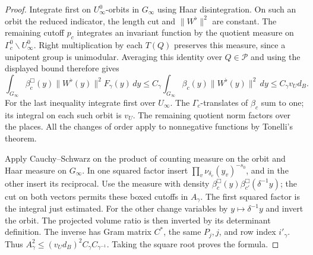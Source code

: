 \documentclass[a4paper,11pt]{article}
\theoremstyle{definition}
\theoremstyle{remark}
\numberwithin{equation}{section}
\begin{document}
\begin{proof}
Integrate first on \(U_\infty^0\)-orbits in \(G_\infty\) using
Haar disintegration. On such an orbit the reduced indicator,
the length cut and \(\|W^\flat\|^2\) are constant. The remaining
cutoff \(p_c\) integrates an invariant function by the quotient
measure on \(\Gamma_c^0\backslash U_\infty^0\). Right
multiplication by each \(T(Q)\) preserves this measure,
since a unipotent group is unimodular. Averaging this identity
over \(Q\in\mathcal P\) and using the displayed bound therefore gives
\[
 \int_{G_\infty}\beta_c^\Box(y)\|W^\flat(y)\|^2F_\gamma(y)\,dy
 \le C_\gamma\int_{G_\infty}\beta_c(y)\|W^\flat(y)\|^2\,dy
 \le C_\gamma v_U d_B .
\]
For the last inequality integrate first over \(U_\infty\).
The \(\Gamma_c\)-translates of \(\beta_c\) sum to one; its
integral on each such orbit is \(v_U\). The remaining quotient
norm factors over the places. All the changes of order apply
to nonnegative functions by Tonelli's theorem.

Apply Cauchy--Schwarz on the product of counting measure on
the orbit and Haar measure on \(G_\infty\). In one squared
factor insert \(\prod_v\nu_{\delta_v}(y_v)^{-s_0}\), and in the
other insert its reciprocal. Use the measure with density
\(\beta_c^\Box(y)\beta_{c'}^\Box(\delta^{-1}y)\); the cut on
both vectors permits these boxed cutoffs in \(A_\gamma\).
The first squared factor is the integral just estimated.
For the other change variables by \(y\mapsto\delta^{-1}y\)
and invert the orbit. The projected volume ratio is then
inverted by its determinant definition. The inverse has Gram
matrix \(C^*\), the same \(P_j,j\), and row index \(i'_\gamma\).
Thus \(A_\gamma^2\le(v_Ud_B)^2 C_\gamma C_{\gamma^{-1}}\).
Taking the square root proves the formula.
\end{proof}
\end{document}
